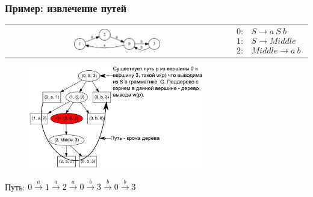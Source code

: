 \documentclass[xcolor=table]{beamer}
\begin{document}
\begin{frame}[fragile]
  \transwipe[direction=90]
  \frametitle{Пример: извлечение путей}
\begin{center}
\begin{tabular}{  c  c  }
    \includegraphics[width=0.4\textwidth]{pictures/input.pdf}
    &
$
 
\begin{array}{rl} 
   0:& S \rightarrow a \ S \ b \\
   1:& S \rightarrow Middle \\
   2:& Middle \rightarrow a \ b
\end{array}

$
\end{tabular}

\begin{figure}[ht]
    \centering
        \includegraphics[width=0.68\textwidth]{pictures/AnBn_2_m.pdf}      
\end{figure}
Путь: $0\xrightarrow{a}1\xrightarrow{a}2\xrightarrow{a}0\xrightarrow{b}3\xrightarrow{b}0\xrightarrow{b}3$
\end{center}                
\end{frame}
\end{document}
